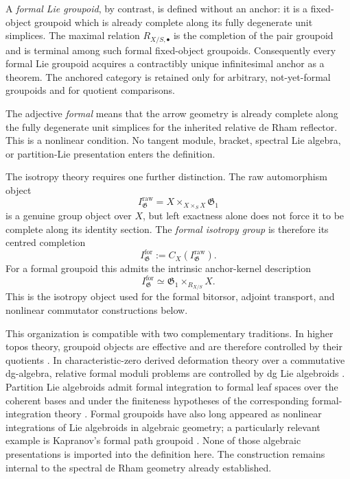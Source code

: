 A \emph{formal Lie groupoid}, by contrast, is defined without an anchor: it is
a fixed-object groupoid which is already complete along its fully degenerate
unit simplices.  The maximal relation $R_{X/S,\bullet}$ is the completion of
the pair groupoid and is terminal among such formal fixed-object groupoids.
Consequently every formal Lie groupoid acquires a contractibly unique
infinitesimal anchor as a theorem.  The anchored category is retained only for
arbitrary, not-yet-formal groupoids and for quotient comparisons.

The adjective \emph{formal} means that the arrow geometry is already complete
along the fully degenerate unit simplices for the inherited relative de Rham
reflector.  This is a nonlinear condition.  No tangent module, bracket,
spectral Lie algebra, or partition-Lie presentation enters the definition.

The isotropy theory requires one further distinction.  The raw automorphism
object
\[
    I^{\mathrm{raw}}_{\mathfrak G}
    =
    X\times_{X\times_SX}\mathfrak G_1
\]
is a genuine group object over $X$, but left exactness alone does not force it
to be complete along its identity section.  The \emph{formal isotropy group}
is therefore its centred completion
\[
    I^{\mathrm{for}}_{\mathfrak G}
    :=
    C_X(I^{\mathrm{raw}}_{\mathfrak G}).
\]
For a formal groupoid this admits the intrinsic anchor-kernel description
\[
    I^{\mathrm{for}}_{\mathfrak G}
    \simeq
    \mathfrak G_1\times_{R_{X/S}}X.
\]
This is the isotropy object used for the formal bitorsor, adjoint transport,
and nonlinear commutator constructions below.

This organization is compatible with two complementary traditions.  In higher
topos theory, groupoid objects are effective and are therefore controlled by
their quotients \cite{LurieHTT}.  In characteristic-zero derived deformation
theory over a commutative dg-algebra, relative formal moduli problems are
controlled by dg Lie algebroids \cite{Nuiten2019}.  Partition Lie algebroids
admit formal integration to formal leaf spaces over the coherent bases and
under the finiteness hypotheses of the corresponding formal-integration
theory \cite{BrantnerMagidsonNuiten2025}.  Formal groupoids have also long
appeared as nonlinear integrations of Lie algebroids in algebraic geometry;
a particularly relevant example is Kapranov's formal path groupoid
\cite{Kapranov2007}.  None of those algebraic presentations is imported into
the definition here.  The construction remains internal to the spectral
de Rham geometry already established.

